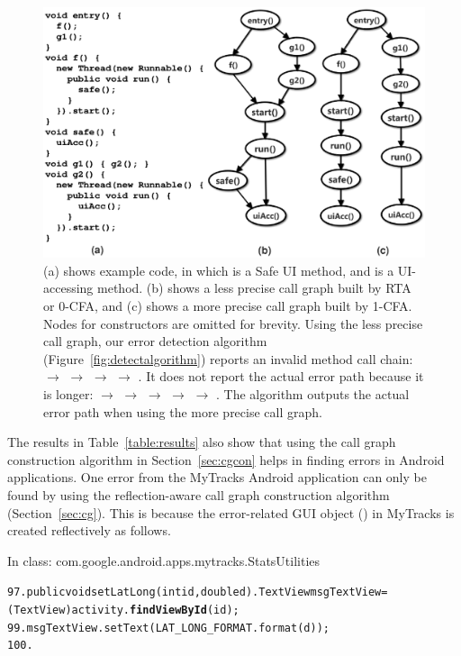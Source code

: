 \begin{figure}[t]
  \centering
  \includegraphics[scale=0.45]{cgexample}
  \vspace*{-5.0ex}\caption {{\label{fig:ex} (a) shows example code, in which
 is a Safe UI method, and  is a UI-accessing method.
(b) shows a less precise call graph built by RTA or 0-CFA, and (c) shows a more
precise call graph built by 1-CFA. Nodes for constructors are omitted for brevity.
Using the less precise call graph, our error
detection algorithm (Figure~\ref{fig:detectalgorithm}) reports an invalid method
call chain: 
$\rightarrow$  $\rightarrow$  $\rightarrow$ 
$\rightarrow$ . It does not report
the actual error path because it is longer:  $\rightarrow$  $\rightarrow$
 $\rightarrow$  $\rightarrow$  $\rightarrow$ .
The algorithm outputs the actual error path when using the more precise call graph.
}}
\end{figure}



The results in Table~\ref{table:results} also show that using the
call graph construction algorithm in Section~\ref{sec:cgcon}
helps in finding errors in Android applications. One error from the MyTracks Android application
can only be found by using the reflection-aware call graph construction algorithm (Section~\ref{sec:cg}).
This is because the error-related GUI object () in MyTracks is created
reflectively as follows.

{\vspace{2mm}
\hspace{3mm}\small{In class: com.google.android.apps.mytracks.StatsUtilities}
\vspace{-2mm}
\begin{CodeOut}
\begin{alltt}
97.  public void setLatLong(int id, double d) .     TextView msgTextView = (TextView) activity.\textbf{findViewById}(id);
99.     msgTextView.setText(LAT\_LONG\_FORMAT.format(d));
100. \ttrcb
\end{alltt}
\end{CodeOut}}

